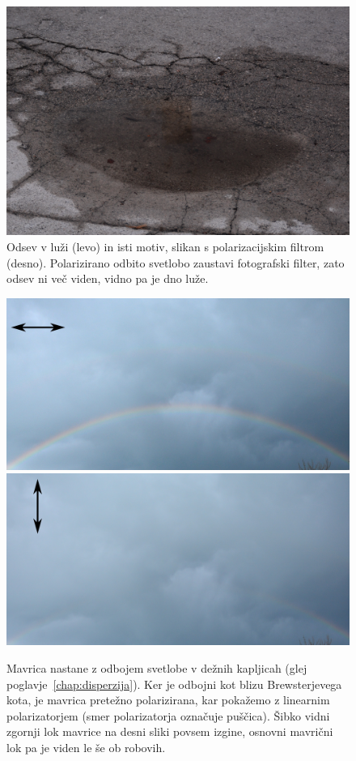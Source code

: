 \begin{remark}
\begin{figure}[!htp]
\includegraphics[width=7truecm]{slike/04_photos_grad2.jpg}
\caption{Odsev v luži (levo) in isti motiv, slikan s polarizacijskim filtrom (desno). 
Polarizirano odbito svetlobo zaustavi fotografski filter, zato odsev ni več viden,
vidno pa je dno luže.}
\label{fig:04_odsevgrad}
\end{figure}
\begin{figure}[!htp]
\centering
\includegraphics[width=7truecm]{slike/04_PolMavrica_a.jpg}\hfill
\includegraphics[width=7truecm]{slike/04_PolMavrica_b.jpg}
\caption{Mavrica nastane z odbojem svetlobe v dežnih kapljicah (glej poglavje~\ref{chap:disperzija}).
Ker je odbojni kot blizu Brewsterjevega kota, je mavrica pretežno polarizirana, kar pokažemo z linearnim 
polarizatorjem (smer polarizatorja označuje puščica). Šibko vidni zgornji lok mavrice na desni sliki povsem 
izgine, osnovni mavrični lok pa je viden le še ob robovih.}
\label{fig:04_MavricaFoto}
\end{figure}
\end{remark}

